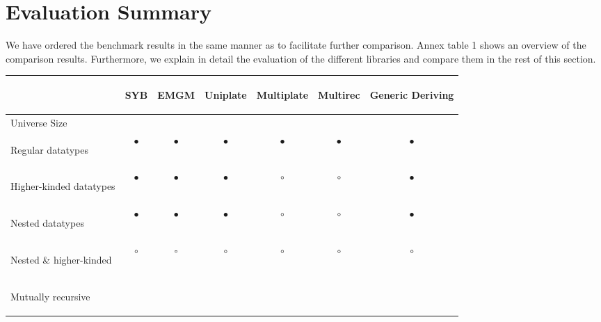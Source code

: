 \documentclass[twocolumn,11pt,a4paper]{article}
\newcommand{\sufficient}{\tiny{$ \square $}}
\begin{document}
\section{Evaluation Summary}\label{evaluation}
We have ordered the benchmark results in the same manner as \citet{Rodriguez:2008:art} to facilitate further comparison. 
Annex table 1 shows an overview of the comparison results.
Furthermore, we explain in detail the evaluation of the different libraries and compare them in the rest of this section.

\begin{table*}[ht]

\begin{tabular}{l | c c c c c c}
& \begin{tiny}
SYB
\end{tiny} & \begin{tiny}
EMGM
\end{tiny} & \begin{tiny}
Uniplate
\end{tiny} & \begin{tiny}
Multiplate
\end{tiny} & \begin{tiny}
Multirec
\end{tiny} & \begin{tiny}
Generic Deriving
\end{tiny} \\
\hline
Universe Size & & & & & & \\
\begin{small}
Regular datatypes
\end{small} & $ \bullet $ & $ \bullet $ & $ \bullet $ & $ \bullet $ & $\bullet$ & $ \bullet $ \\
\begin{small}
Higher-kinded datatypes
\end{small} & $ \bullet $ & $ \bullet $ & $ \bullet $ & $ \circ $ & $ \circ $ & $ \bullet $ \\
\begin{small}
Nested datatypes
\end{small} & $ \bullet $ & $ \bullet $ & $ \bullet $ & $ \circ $ & $ \circ $ & $ \bullet $ \\
\begin{small}
Nested \& higher-kinded
\end{small} & $ \circ $ & \sufficient & $ \circ $ & $ \circ $ & $ \circ $ & $ \circ $ \\
\begin{small}
Mutually recursive

\end{small}
\end{tabular}
\end{table*}
\end{document}
